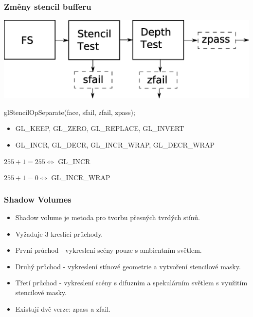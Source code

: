 \begin{frame}
  \frametitle{Změny stencil bufferu}

  \includegraphics[width=\textwidth]{pics/shadows/shadowVolumes/stencil-test2.eps}

  \vfill

  glStencilOpSeparate(face, sfail, zfail, zpass);

  \begin{itemize}
    \item GL\_KEEP, GL\_ZERO, GL\_REPLACE, GL\_INVERT
    \item GL\_INCR, GL\_DECR, GL\_INCR\_WRAP, GL\_DECR\_WRAP
  \end{itemize}

  \vfill

  $255 + 1 = 255 \Longleftrightarrow $ GL\_INCR

  $255 + 1 = 0 \Longleftrightarrow $ GL\_INCR\_WRAP

\end{frame}




\begin{frame}
  \frametitle{Shadow Volumes}
  \begin{itemize}
    \item Shadow volume je metoda pro tvorbu přesných tvrdých stínů.
    \item Vyžaduje 3 kreslící průchody.
    \item První průchod - vykreslení scény pouze s ambientním světlem.
    \item Druhý průchod - vykreslení stínové geometrie a vytvoření stencilové masky.
    \item Třetí průchod - vykreslení scény s difuzním a spekulárním světlem s využitím stencilové masky.
    \item Existují dvě verze: zpass a zfail.
  \end{itemize}
\end{frame}

